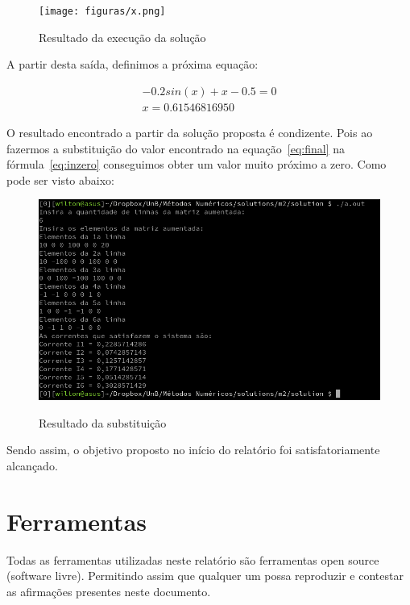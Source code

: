 \documentclass[12pt, hidelinks]{article}
\begin{document}
\begin{figure}[!h]
  \centering
  \texttt{[image: figuras/x.png]}\\
  \caption{Resultado da execução da solução}\label{fig:valx}
\end{figure}

A partir desta saída, definimos a próxima equação:

\begin{eqnarray}\label{eq:final}
  -0.2sin(x) + x - 0.5 = 0 \nonumber\\
  x = 0.61546816950
\end{eqnarray}

O resultado encontrado a partir da solução proposta é condizente. Pois ao fazermos a substituição do valor encontrado na equação~\eqref{eq:final} na fórmula~\eqref{eq:inzero} conseguimos obter um valor muito próximo a zero. Como pode ser visto abaixo:

\begin{figure}[!h]
  \centering
  \includegraphics[width=15cm]{figuras/printx.png}\\
  \caption{Resultado da substituição}\label{fig:printx}
\end{figure}

Sendo assim, o objetivo proposto no início do relatório foi satisfatoriamente alcançado.

\newpage
\section{Ferramentas}
Todas as ferramentas utilizadas neste relatório são ferramentas open source (software livre). Permitindo assim que qualquer um possa reproduzir e contestar as afirmações presentes neste documento.
\end{document}
